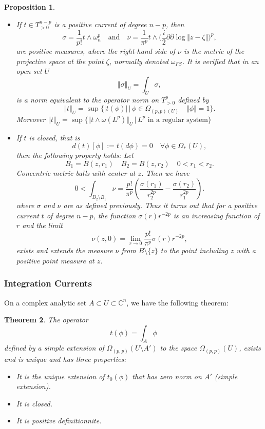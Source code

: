 \documentclass[12pt,twoside,a4paper]{report}
\newtheorem{theorem}{Theorem}[section]
\newtheorem{prop}[theorem]{Proposition}
\begin{document}
\begin{prop}
\begin{itemize}
        \item[4] If $t\in T^{n-p}_{>0}$ is a positive current of degree $n-p$, then
        \[
            \sigma=\frac{1}{p!}t\wedge\omega_n^{p}
            \quad\text{and}\quad
            \nu=\frac{1}{\pi^p}t\wedge\Big(\frac{i}{2}\partial\overline{\partial}\log\Vert z-\zeta\Vert\Big)^{p},
        \]
        are positive measures, where the right-hand side of $\nu$ is the metric of the projective space at the point $\zeta$, normally denoted $\omega_{FS}$. It is verified that in an open set $U$
        \[
            \Vert\sigma\Vert_{U}=\int_{U}\sigma,
        \]
        is a norm equivalent to the operator norm on $T^p_{>0}$ defined by
        \[
            \Vert t\Vert_U=\sup\{|t(\phi)|\,\vert\,\phi\in \Omega_{(p,p)(U)}\quad\Vert\phi\Vert=1\}.
        \]
        Moreover $\Vert t\Vert_U=\sup\{\Vert t\wedge\omega(L^{p})\Vert_U\,\vert\,L^{p}\text{ in a regular system}\}$
        \item[5] If $t$ is closed, that is
        \[
            d(t)[\phi]:=t(d\phi)=0\quad\forall\phi\in\Omega_{*}(U),
        \]
        then the following property holds: Let
        \[
            B_1=B(z,r_1)\quad B_2=B(z,r_2)\quad 0<r_1<r_2.
        \]
        Concentric metric balls with center at $z$. Then we have
        \[
            0<\int_{B_2\setminus B_1}\nu= \frac{p!}{\pi^{p}}(\frac{\sigma(r_1)}{r^{2p}_2}-\frac{\sigma(r_2)}{r^{2p}_1}).
        \]
        where $\sigma$ and $\nu$ are as defined previously. Thus it turns out that for a positive current $t$ of degree $n-p$, the function $\sigma(r)r^{-2p}$ is an increasing function of $r$ and the limit
        \[
            \nu(z,0)=\lim_{r\rightarrow 0}\frac{p!}{\pi^{p}}\sigma(r)r^{-2p},
        \]
        exists and extends the measure $\nu$ from $B\setminus\{z\}$ to the point including $z$ with a positive point measure at $z$.
    \end{itemize}
\end{prop}


\subsubsection{Integration Currents}
\label{sec:org9982aa5}
On a complex analytic set $A\subset U\subset\mathbb{C}^n$, we have the following theorem:

\begin{theorem}
The operator
\[
    t(\phi)=\int_A\phi
\]
defined by a simple extension of $\Omega_{(p,p)}(U\setminus A')$ to the space $\Omega_{(p,p)}(U)$, exists and is unique and has three properties:
\begin{itemize}
    \item[a] It is the unique extension of $t_0(\phi)$ that has zero norm on $A'$ (simple extension).
    \item[b] It is closed.
    \item[c] It is positive definitionnite.
\end{itemize}
\end{theorem}
\end{document}
